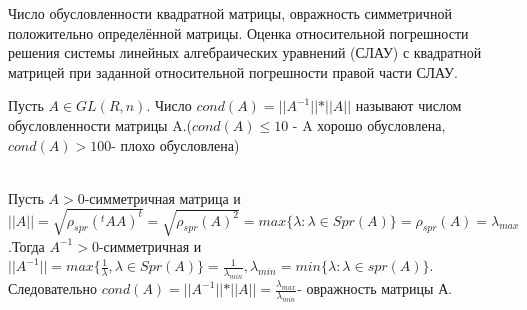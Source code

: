 \documentclass[__main__.tex]{subfiles}
\begin{document}
Число обусловленности квадратной матрицы, овражность симметричной положительно определённой матрицы. Оценка относительной погрешности решения системы линейных алгебраических уравнений (СЛАУ) с квадратной матрицей при заданной относительной погрешности правой части СЛАУ.

\begin{definition}
	Пусть $A\in GL(R,n)$.
	Число $cond(A)=\vert\vert A^{-1} \vert\vert *\vert\vert A \vert\vert $ называют числом обусловленности матрицы A.($cond(A)\leq 10$ - A хорошо обусловлена,$cond(A)>100$- плохо обусловлена)\\
\end{definition}
	
\begin{definition}\\
	Пусть $A>0$-симметричная матрица и $\vert\vert A \vert\vert= \sqrt{\rho_{spr}(^tAA)^t}=\sqrt{\rho_{spr}(A)^2}=max\lbrace\lambda:\lambda\in Spr(A)\rbrace=\rho_{spr}(A)=\lambda_{max}$.Тогда $A^{-1}>0$-симметричная и $\vert\vert A^{-1} \vert\vert=max\lbrace\frac{1}{\lambda},\lambda \in Spr(A)\rbrace=\frac{1}{\lambda_{min}}, \lambda_{min}=min\lbrace\lambda:\lambda \in spr(A)\rbrace$.
	Следовательно $cond(A)=\vert\vert A^{-1} \vert\vert *\vert\vert A \vert\vert=\frac{\lambda_{max}}{\lambda_{min}} $- овражность матрицы А.\\
\end{definition}
\end{document}
